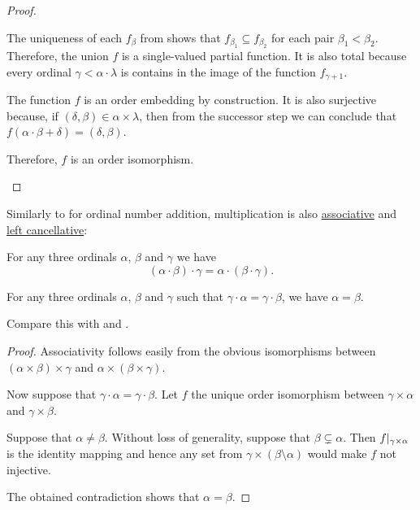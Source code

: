 \begin{proof}
\begin{itemize}
    The uniqueness of each \( f_\beta \) from  shows that \( f_{\beta_1} \subseteq f_{\beta_2} \) for each pair \( \beta_1 < \beta_2 \). Therefore, the union \( f \) is a single-valued partial function. It is also total because every ordinal \( \gamma < \alpha \cdot \lambda \) is contains in the image of the function \( f_{\gamma + 1} \).

    The function \( f \) is an order embedding by construction. It is also surjective because, if \( (\delta, \beta) \in \alpha \times \lambda \), then from the successor step we can conclude that \( f(\alpha \cdot \beta + \delta) = (\delta, \beta) \).

    Therefore, \( f \) is an order isomorphism.
  \end{itemize}
\end{proof}

\begin{proposition}\label{thm:ordinal_multiplication_algebraic_properties}
  Similarly to  for ordinal number addition, multiplication is also \hyperref[def:binary_operation/associative]{associative} and \hyperref[def:binary_operation/cancellative]{left cancellative}:
  \begin{thmenum}
     For any three ordinals \( \alpha \), \( \beta \) and \( \gamma \) we have
    \begin{equation*}
      (\alpha \cdot \beta) \cdot \gamma = \alpha \cdot (\beta \cdot \gamma).
    \end{equation*}

     For any three ordinals \( \alpha \), \( \beta \) and \( \gamma \) such that \( \gamma \cdot \alpha = \gamma \cdot \beta \), we have \( \alpha = \beta \).
  \end{thmenum}

  Compare this with  and .
\end{proposition}
\begin{proof}
   Associativity follows easily from the obvious isomorphisms between \( (\alpha \times \beta) \times \gamma \) and \( \alpha \times (\beta \times \gamma) \).

   Now suppose that \( \gamma \cdot \alpha = \gamma \cdot \beta \). Let \( f \) the unique order isomorphism between \( \gamma \times \alpha \) and \( \gamma \times \beta \).

  Suppose that \( \alpha \neq \beta \). Without loss of generality, suppose that \( \beta \subsetneq \alpha \). Then \( f\vert_{\gamma \times \alpha} \) is the identity mapping and hence any set from \( \gamma \times (\beta \setminus \alpha) \) would make \( f \) not injective.

  The obtained contradiction shows that \( \alpha = \beta \).
\end{proof}

